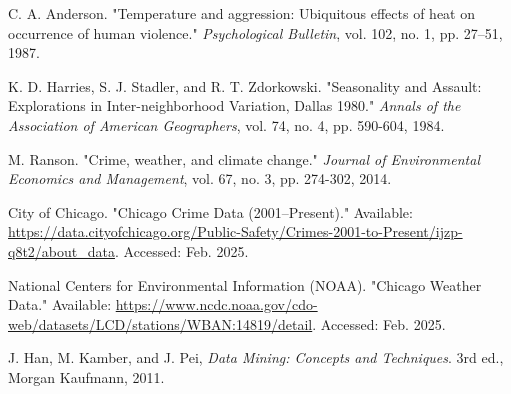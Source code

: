 \documentclass[sigconf,twocolumn,11pt]{acmart}
\begin{document}
\begin{thebibliography}{99}


C. A. Anderson. "Temperature and aggression: Ubiquitous effects of heat on occurrence of human violence." 
\textit{Psychological Bulletin}, vol. 102, no. 1, pp. 27–51, 1987.


K. D. Harries, S. J. Stadler, and R. T. Zdorkowski. "Seasonality and Assault: Explorations in Inter-neighborhood Variation, Dallas 1980." 
\textit{Annals of the Association of American Geographers}, vol. 74, no. 4, pp. 590-604, 1984.


M. Ranson. "Crime, weather, and climate change." 
\textit{Journal of Environmental Economics and Management}, vol. 67, no. 3, pp. 274-302, 2014.


City of Chicago. "Chicago Crime Data (2001–Present)." 
Available: \url{https://data.cityofchicago.org/Public-Safety/Crimes-2001-to-Present/ijzp-q8t2/about_data}. Accessed: Feb. 2025.


National Centers for Environmental Information (NOAA). "Chicago Weather Data." 
Available: \url{https://www.ncdc.noaa.gov/cdo-web/datasets/LCD/stations/WBAN:14819/detail}. Accessed: Feb. 2025.

J. Han, M. Kamber, and J. Pei, \textit{Data Mining: Concepts and Techniques}. 3rd ed., Morgan Kaufmann, 2011.

\end{thebibliography}
\end{document}
